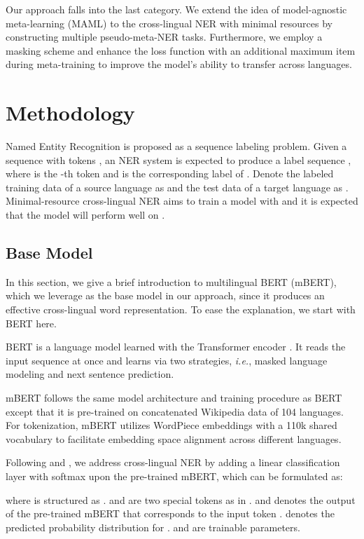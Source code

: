 \documentclass[letterpaper]{article} \usepackage{aaai20}  \usepackage{times}  \usepackage{helvet} \usepackage{courier}  \usepackage[hyphens]{url}  \usepackage{graphicx} \urlstyle{rm} \def\UrlFont{\rm}  \usepackage{graphicx}
\newcommand{\ie}{\textit{i.e.}}
\begin{document}
Our approach falls into the last category. We extend the idea of model-agnostic meta-learning (MAML) \cite{finn2017model} to the cross-lingual NER with minimal resources by constructing multiple pseudo-meta-NER tasks. 
Furthermore, we employ a masking scheme and enhance the loss function with an additional maximum item during meta-training to improve the model's ability to transfer across languages.



 \section{Methodology}

Named Entity Recognition is proposed as a sequence labeling problem.
Given a sequence with  tokens , an NER system is expected to produce a label sequence , where  is the -th token and  is the corresponding label of .
Denote the labeled training data of a source language as  and the test data of a target language as . 
Minimal-resource cross-lingual NER aims to train a model  with  and it is expected that the model will perform well on .

\subsection{Base Model}
In this section, we give a brief introduction to multilingual BERT \cite{devlin2019bert} (mBERT), which we leverage as the base model in our approach, since it produces an effective cross-lingual word representation. To ease the explanation, we start with BERT \cite{devlin2019bert} here.

BERT is a language model learned with the Transformer encoder \cite{Vaswani2017attention}. 
It reads the input sequence at once and learns via two strategies, \ie, masked language modeling and next sentence prediction.

mBERT follows the same model architecture and training procedure as BERT except that it is pre-trained on concatenated Wikipedia data of 104 languages. For tokenization, mBERT utilizes WordPiece embeddings \cite{wu2016google} with a 110k shared vocabulary to facilitate embedding space alignment across different languages. 

Following \cite{devlin2019bert} and \cite{wu2019beto}, we address cross-lingual NER by adding a linear classification layer with softmax upon the pre-trained mBERT, which can be formulated as:


where  is structured as . 
 and  are two special tokens as in \cite{devlin2019bert}. 
 and  denotes the output of the pre-trained mBERT that corresponds to the input token . 
 denotes the predicted probability distribution for . 
 and  are trainable parameters. 
\end{document}
